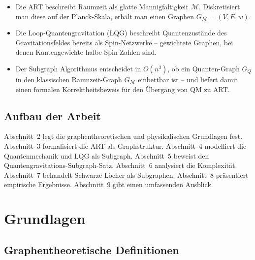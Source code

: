 ﻿\documentclass[a4paper,12pt]{article}
\theoremstyle{definition}
\begin{document}
\begin{itemize}
	\item Die ART beschreibt Raumzeit als glatte Mannigfaltigkeit $\mathcal{M}$.
	      Diskretisiert man diese auf der Planck-Skala, erh\"alt man einen
	      Graphen $G_{\mathcal{M}} = (V, E, w)$.
	\item Die Loop-Quantengravitation (LQG) \cite{rovelli2004} beschreibt
	      Quantenzust\"ande des Gravitationsfeldes bereits als Spin-Netzwerke
	      -- gewichtete Graphen, bei denen Kantengewichte halbe Spin-Zahlen sind.
	\item Der Subgraph Algorithmus \cite{epp2026subgraph} entscheidet in
	      $O(n^3)$, ob ein Quanten-Graph $G_Q$ in den klassischen Raumzeit-Graph
	      $G_{\mathcal{M}}$ einbettbar ist -- und liefert damit einen formalen
	      Korrektheitsbeweis f\"ur den \"Ubergang von QM zu ART.
\end{itemize}

\subsection{Aufbau der Arbeit}

Abschnitt~2 legt die graphentheoretischen und physikalischen Grundlagen
fest. Abschnitt~3 formalisiert die ART als Graphstruktur. Abschnitt~4
modelliert die Quantenmechanik und LQG als Subgraph. Abschnitt~5 beweist
den Quantengravitations-Subgraph-Satz. Abschnitt~6 analysiert die
Komplexit\"at. Abschnitt~7 behandelt Schwarze L\"ocher als Subgraphen.
Abschnitt~8 pr\"asentiert empirische Ergebnisse. Abschnitt~9 gibt einen
umfassenden Ausblick.

\section{Grundlagen}

\subsection{Graphentheoretische Definitionen}
\end{document}
